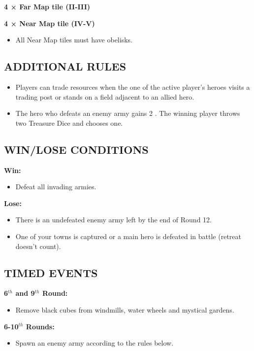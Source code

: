 \begin{multicols*}{2}
\textbf{4 × Far Map tile (II-III)}

\textbf{4 × Near Map tile (IV-V)}
\begin{itemize}
    \item All Near Map tiles must have obelisks.
\end{itemize}

\subsection*{\MakeUppercase{Additional rules}}

\begin{itemize}
    \item Players can trade resources when the one of the active player's heroes 
    visits a trading post or stands on a field adjacent to an allied hero.
    \item The hero who defeats an enemy army gains 2 .
    The winning player throws two Treasure Dice and chooses one.
\end{itemize}

\subsection*{\MakeUppercase{Win/lose conditions}}

\textbf{Win:}
\begin{itemize}
    \item Defeat all invading armies.
\end{itemize}

\textbf{Lose:}
\begin{itemize}
    \item There is an undefeated enemy army left by the end of Round 12.
    \item One of your towns is captured or a main hero is defeated in battle 
    (retreat doesn't count).
\end{itemize}

\subsection*{\MakeUppercase{Timed events}}

\textbf{6$^{th}$ and 9$^{th}$ Round:}
\begin{itemize}
    \item Remove black cubes from windmills, water wheels and mystical gardens.
\end{itemize}

\textbf{6-10$^{th}$ Rounds:}
\begin{itemize}
    \item Spawn an enemy army according to the rules below.
\end{itemize}


\end{multicols*}
